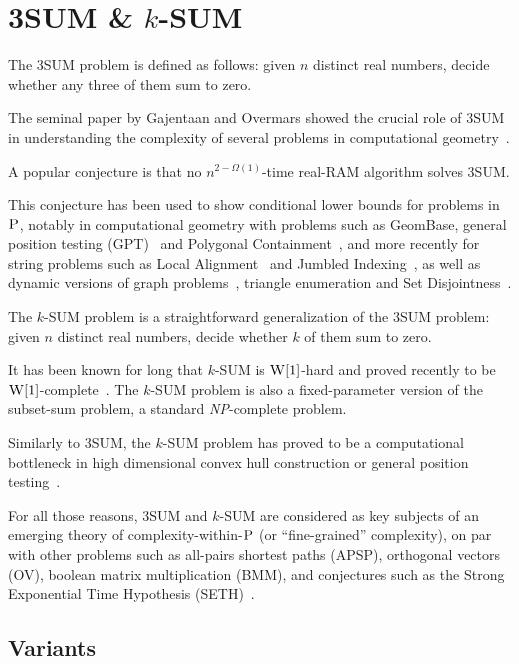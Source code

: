 \section{3SUM \& \texorpdfstring{\(k\)-SUM}{k-SUM}}%
\label{sec:history:sum}

The 3SUM problem is defined as follows: given $n$ distinct real numbers, decide
whether any three of them sum to zero.
%

%
The seminal paper by Gajentaan and Overmars showed the crucial role
of 3SUM in understanding the complexity of several problems in computational
geometry~\cite{GO95}.

A popular conjecture is that no $n^{2-\Omega(1)}$-time real-RAM algorithm
solves 3SUM.
%

%
This conjecture has been used to show conditional
lower bounds for problems in \(\textsc{P}\),
notably in computational geometry with problems
such as
GeomBase, general position testing (GPT)~\cite{GO95}
and
Polygonal Containment~\cite{BH01},
and more recently for string problems such as
Local Alignment~\cite{AVW14}
and
Jumbled Indexing~\cite{ACLL14},
as well as
dynamic versions of graph problems~\cite{Pa10,KPP16,AV14},
triangle enumeration and Set Disjointness~\cite{KPP16}.


The \(k\)-SUM problem is a straightforward generalization of the 3SUM problem:
given \(n\) distinct real numbers, decide whether \(k\) of them sum to zero.
%


It has been known for long that \(k\)-SUM is $\textsc{W}[1]$-hard and proved
recently to be $\textsc{W}[1]$-complete~\cite{ALW14}.
The \(k\)-SUM problem is also a fixed-parameter version of the subset-sum
problem, a standard \textit{NP}-complete problem.

Similarly to 3SUM, the \(k\)-SUM problem
has proved to be a computational bottleneck in high dimensional convex hull
construction or general
position testing~\cite{Er99b}.

For all those reasons, 3SUM and \(k\)-SUM are considered as key subjects of an
emerging theory of complexity-within-\(\textsc{P}\) (or ``fine-grained''
complexity), on par with other problems such as
all-pairs shortest paths (APSP),
orthogonal vectors (OV),
boolean matrix multiplication (BMM),
and conjectures such as
the Strong Exponential Time Hypothesis (SETH)~\cite{MO01,PW10,AVY15,HKNS15,CGIMPS16}.



\subsection{Variants}

